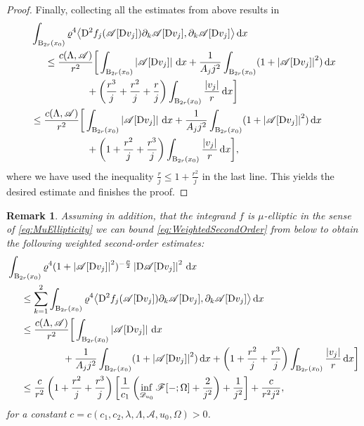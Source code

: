 \documentclass[a4paper,10pt,reqno,oneside]{amsart}
\numberwithin{equation}{section}
\newcommand{\N}{\mathbb N}
\newcommand{\ball}{\mathrm{B}}
\newcommand{\A}{\mathscr{A}}
\newcommand{\D}{\mathrm{D}}
\newcommand{\intd}{\,\mathrm{d}}
\newcommand{\dx}[1]{\,\mathrm{d}#1}
\newcommand{\del}{\partial}
\newcommand{\skalarProd}[2]{\big\langle#1,#2\big\rangle}
\newcommand{\abs}[1]{\left\lvert#1\right\rvert}
\newcommand{\F}{\mathscr{F}}
\newtheorem{rem}[thm]{Remark}
\begin{document}
\begin{proof}
\pagebreak Finally, collecting all the estimates from above results in
 \begin{align*}
  	&\int_{\ball_{2r}(x_0)} \varrho^4\skalarProd{\D^2 f_j(\A[\D v_j])\del_k \A[\D v_j]}{\partial_k\A[\D v_j]}\intd x\\
  	&\hspace{0.5cm}\leq \frac{c(\Lambda,\A)}{r^2} \bigg[\int_{\ball_{2r}(x_0)} \abs{\A [\D v_j]}\dx{x} + \frac{1}{A_j j^2}\int_{\ball_{2r}(x_0)} (1+\abs{\A [\D v_j]}^2)\dx{x}\\ 
  	&\hspace{2cm}+ \bigg(\frac{r^3}{j}+\frac{r^2}{j} +\frac{r}{j}\bigg)\int_{\ball_{2r}(x_0)} \frac{\abs{v_j}}{r}\dx{x} \bigg]\\
  	&\leq \frac{c(\Lambda,\A)}{r^2} \bigg[\int_{\ball_{2r}(x_0)} \abs{\A [\D v_j]}\dx{x} + \frac{1}{A_j j^2}\int_{\ball_{2r}(x_0)} (1+\abs{\A [\D v_j]}^2)\dx{x}\\ 
  	&\hspace{2cm}+ \bigg(1+\frac{r^2}{j}+\frac{r^3}{j} \bigg)\int_{\ball_{2r}(x_0)} \frac{\abs{v_j}}{r}\dx{x} \bigg],
 \end{align*}
where we have used the inequality $\frac{r}{j} \leq 1+\frac{r^2}{j}$ in the last line. This yields the desired estimate and finishes the proof. 
\end{proof}

\begin{rem}
	Assuming in addition, that the integrand $f$ is $\mu$-elliptic in the sense of \eqref{eq:MuEllipticity} we can bound \eqref{eq:WeightedSecondOrder} from below to obtain the following weighted second-order estimates: 
	\begin{align}\label{eq:WeightedSecondOrder_MuElliptic}
		&\int_{\ball_{2r}(x_0)} \varrho^4 (1+\abs{\A[\D v_j]}^2)^{-\frac{\mu}{2}} \abs{\D\A[\D v_j]}^2\dx{x} \notag \\
		&\hspace{0.5cm}\leq \sum_{k=1}^2\int_{\ball_{2r}(x_0)} \varrho^4\skalarProd{\D^2 f_j(\A[\D v_j])\del_k \A[\D v_j]}{\partial_k\A[\D v_j]}\intd x \notag \\
		&\hspace{0.5cm}\leq \frac{c(\Lambda,\A)}{r^2} \bigg[\int_{\ball_{2r}(x_0)} \abs{\A [\D v_j]}\dx{x}\\
		&\hspace{2cm}+ \frac{1}{A_j j^2}\int_{\ball_{2r}(x_0)} (1+\abs{\A [\D v_j]}^2)\dx{x}
		+ \bigg(1+\frac{r^2}{j}+\frac{r^3}{j} \bigg)\int_{\ball_{2r}(x_0)} \frac{\abs{v_j}}{r}\dx{x} \bigg]\notag\\
		&\hspace{0.5cm}\leq 
		\frac{c}{r^2}\left(1+\frac{r^2}{j}+\frac{r^3}{j}\right)\left[\frac{1}{c_1}\left(\inf_{\mathscr{D}_{u_0}} \F[-;\Omega] + \frac{2}{j^2}\right)+\frac{1}{j^2}\right] + \frac{c}{r^2 j^2}\notag ,
	\end{align}
	for a constant $c=c(c_1,c_2,\lambda,\Lambda,\A,u_0,\Omega)>0$.
\end{rem}
\end{document}
